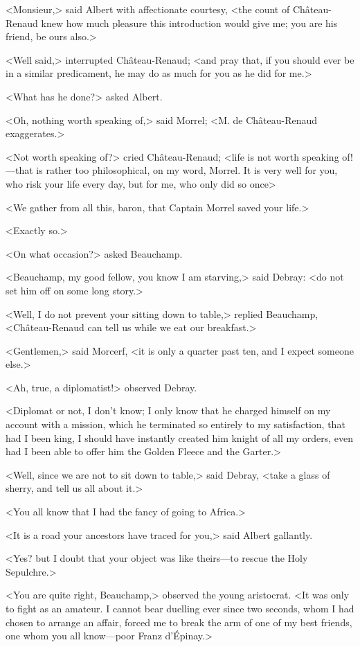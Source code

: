  <Monsieur,> said Albert with affectionate courtesy, <the count of Château-Renaud knew how much pleasure this introduction would give me; you are his friend, be ours also.> 

 <Well said,> interrupted Château-Renaud; <and pray that, if you should ever be in a similar predicament, he may do as much for you as he did for me.> 

 <What has he done?> asked Albert. 

 <Oh, nothing worth speaking of,> said Morrel; <M. de Château-Renaud exaggerates.> 

 <Not worth speaking of?> cried Château-Renaud; <life is not worth speaking of!—that is rather too philosophical, on my word, Morrel. It is very well for you, who risk your life every day, but for me, who only did so once\longdash> 

 <We gather from all this, baron, that Captain Morrel saved your life.> 

 <Exactly so.> 

 <On what occasion?> asked Beauchamp. 

 <Beauchamp, my good fellow, you know I am starving,> said Debray: <do not set him off on some long story.> 

 <Well, I do not prevent your sitting down to table,> replied Beauchamp, <Château-Renaud can tell us while we eat our breakfast.> 

 <Gentlemen,> said Morcerf, <it is only a quarter past ten, and I expect someone else.> 

 <Ah, true, a diplomatist!> observed Debray. 

 <Diplomat or not, I don't know; I only know that he charged himself on my account with a mission, which he terminated so entirely to my satisfaction, that had I been king, I should have instantly created him knight of all my orders, even had I been able to offer him the Golden Fleece and the Garter.> 

 <Well, since we are not to sit down to table,> said Debray, <take a glass of sherry, and tell us all about it.> 

 <You all know that I had the fancy of going to Africa.> 

 <It is a road your ancestors have traced for you,> said Albert gallantly. 

 <Yes? but I doubt that your object was like theirs—to rescue the Holy Sepulchre.> 

 <You are quite right, Beauchamp,> observed the young aristocrat. <It was only to fight as an amateur. I cannot bear duelling ever since two seconds, whom I had chosen to arrange an affair, forced me to break the arm of one of my best friends, one whom you all know—poor Franz d'Épinay.> 


